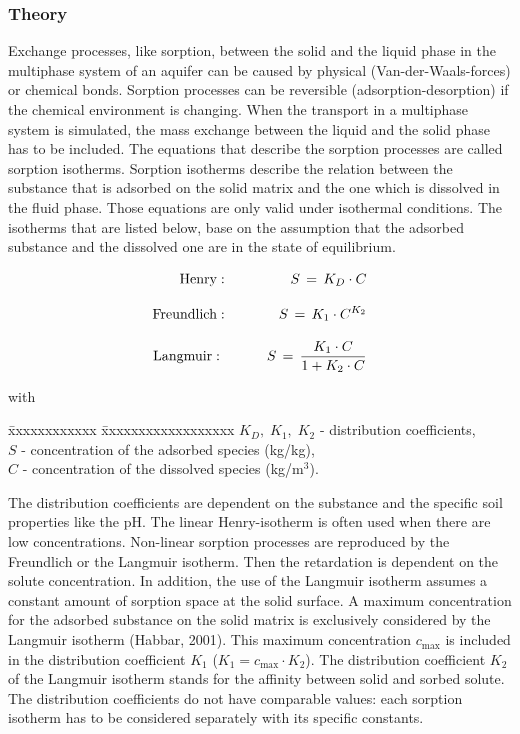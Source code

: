 \subsubsection*{Theory}

Exchange processes, like sorption, between the solid and the liquid phase in the multiphase system of an aquifer can be caused by physical (Van-der-Waals-forces) or chemical bonds. Sorption processes can be reversible (adsorption-desorption) if the chemical environment is changing. When the transport in a multiphase system is simulated, the mass exchange between the liquid and the solid phase has to be included. The equations that describe the sorption processes are called sorption isotherms. Sorption isotherms describe the relation between the substance that is adsorbed on the solid matrix and the one which is dissolved in the fluid phase. Those equations are only valid under isothermal conditions. The isotherms that are listed below, base on the assumption that the adsorbed substance and the dissolved one are in the state of equilibrium.

\begin{eqnarray}
\mathrm{Henry:}
& \qquad &
S\,=\,K_D\cdot C \\[2.0ex]
\label{eq58}
%
\mathrm{Freundlich:}
& \qquad &
S\,=\,K_1\cdot C^{K_2} \\[2.0ex]
\label{eq59}
%
\mathrm{Langmuir:\hspace*{0.8ex}}
& \qquad &
S\,=\,\frac{K_1\cdot C}{1+K_2\cdot C}
\label{eq510}
\end{eqnarray}

{\small
with
\begin{tabbing}
\=xxxxxxxxxxxx \=xxxxxxxxxxxxxxxxxx \kill
\> $K_D,\; K_1,\; K_2$ \> - distribution coefficients, \\[1.0ex]
\> $S$ \> - concentration of the adsorbed species (kg/kg), \\[1.0ex]
\> $C$ \> - concentration of the dissolved species (kg/m$^3$).
\end{tabbing}
}

The distribution coefficients are dependent on the substance and the specific soil properties like the pH. The linear Henry-isotherm is often used when there are low concentrations. Non-linear sorption processes are reproduced by the Freundlich or the Langmuir isotherm. Then the retardation is dependent on the solute concentration. In addition, the use of the Langmuir isotherm assumes a constant amount of sorption space at the solid surface. A maximum concentration for the adsorbed substance on the solid matrix is exclusively considered by the Langmuir isotherm (Habbar, 2001). This maximum concentration $c_{\mathrm{max}}$ is included in the distribution coefficient $K_1$ ($K_1=c_{\mathrm{max}}\cdot K_2$). The distribution coefficient $K_2$ of the Langmuir isotherm stands for the affinity between solid and sorbed solute. The distribution coefficients do not have comparable values: each sorption isotherm has to be considered separately with its specific constants.
